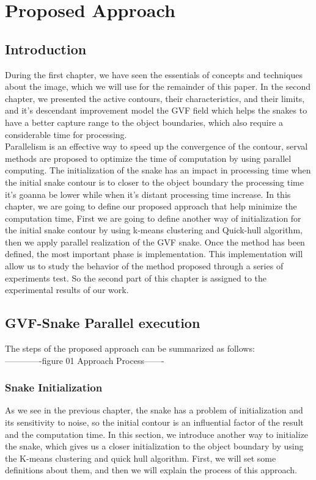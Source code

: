 
\chapter{Proposed Approach}\label{ch:proposed-approach}
\chead{}
\lhead{\bfseries \chaptername {\,} \thechapter }
\cfoot{\bfseries \thepage}
\rhead{}
\section{Introduction}\label{sec:introduction-ch3}
During the first chapter, we have seen the essentials of concepts and techniques
about the image, which we will use for the remainder of this paper. In the second
chapter, we presented the active contours, their characteristics, and their limits, and
it's descendant improvement model the GVF field which helps the snakes to have a
better capture range to the object boundaries, which also require a considerable
time for processing.\\
Parallelism is an effective way to speed up the convergence of the contour, serval
methods are proposed to optimize the time of computation by using parallel
computing. The initialization of the snake has an impact in processing time when the
initial snake contour is to closer to the object boundary the processing time it's
goanna be lower while when it's distant processing time increase.
In this chapter, we are going to define our proposed approach that help minimize the
computation time, First we are going to define another way of initialization for the
initial snake contour by using k-means clustering and Quick-hull algorithm, then we
apply parallel realization of the GVF snake.
Once the method has been defined, the most important phase is implementation.
This implementation will allow us to study the behavior of the method proposed
through a series of experiments test. So the second part of this chapter is assigned to
the experimental results of our work.
\section{GVF-Snake Parallel execution}\label{sec:gvf-snake-parallel-execution}
The steps of the proposed approach can be summarized as follows:
\\-------------figure 01 Approach Process-------
\subsection{Snake Initialization}\label{subsec:snake-initialization}
As we see in the previous chapter, the snake has a problem of initialization and its
sensitivity to noise, so the initial contour is an influential factor of the result and the
computation time. In this section, we introduce another way to initialize the snake,
which gives us a closer initialization to the object boundary by using the K-means
clustering and quick hull algorithm. First, we will set some definitions about them,
and then we will explain the process of this approach.\\
